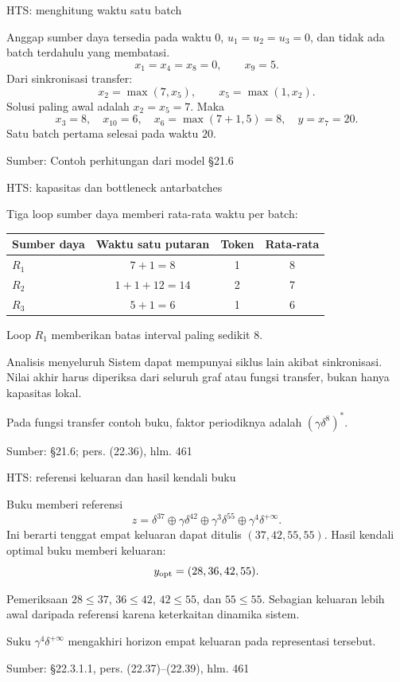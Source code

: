 \documentclass[aspectratio=169,11pt]{beamer}
\newcommand{\source}[1]{%
    \vfill
    \hfill{\tiny\color{gray}Sumber: #1}
}
\begin{document}
\begin{frame}{HTS: menghitung waktu satu batch}

Anggap sumber daya tersedia pada waktu $0$, $u_1=u_2=u_3=0$,
dan tidak ada batch terdahulu yang membatasi.
\[
x_1=x_4=x_8=0,\qquad x_9=5.
\]
Dari sinkronisasi transfer:
\[
x_2=\max(7,x_5),\qquad x_5=\max(1,x_2).
\]
Solusi paling awal adalah $x_2=x_5=7$. Maka
\[
x_3=8,\quad x_{10}=6,\quad
x_6=\max(7+1,5)=8,\quad y=x_7=20.
\]
Satu batch pertama selesai pada waktu $20$.

\source{Contoh perhitungan dari model \S21.6}
\end{frame}
\begin{frame}{HTS: kapasitas dan bottleneck antarbatches}

Tiga loop sumber daya memberi rata-rata waktu per batch:
\begin{center}\begin{tabular}{lccc}\toprule
Sumber daya&Waktu satu putaran&Token&Rata-rata\\\midrule
$R_1$&$7+1=8$&1&8\\
$R_2$&$1+1+12=14$&2&7\\
$R_3$&$5+1=6$&1&6\\\bottomrule
\end{tabular}\end{center}
Loop $R_1$ memberikan batas interval paling sedikit $8$.
\begin{block}{Analisis menyeluruh}
Sistem dapat mempunyai siklus lain akibat sinkronisasi.
Nilai akhir harus diperiksa dari seluruh graf atau fungsi transfer,
bukan hanya kapasitas lokal.
\end{block}
Pada fungsi transfer contoh buku, faktor periodiknya adalah $(\gamma\delta^8)^*$.

\source{\S21.6; pers. (22.36), hlm. 461}
\end{frame}
\begin{frame}{HTS: referensi keluaran dan hasil kendali buku}

Buku memberi referensi
\[
z=\delta^{37}\oplus\gamma\delta^{42}
\oplus\gamma^3\delta^{55}\oplus\gamma^4\delta^{+\infty}.
\]
Ini berarti tenggat empat keluaran dapat ditulis $(37,42,55,55)$.
Hasil kendali optimal buku memberi keluaran:
\[
y_{\rm opt}=(28,36,42,55).
\]
\begin{block}{Pemeriksaan}
$28\le37$, $36\le42$, $42\le55$, dan $55\le55$.
Sebagian keluaran lebih awal daripada referensi karena keterkaitan dinamika sistem.
\end{block}
Suku $\gamma^4\delta^{+\infty}$ mengakhiri horizon empat keluaran pada representasi tersebut.

\source{\S22.3.1.1, pers. (22.37)--(22.39), hlm. 461}
\end{frame}
\end{document}
